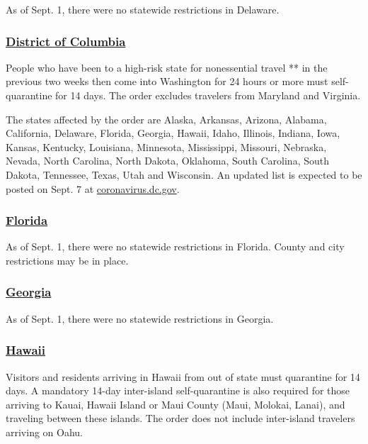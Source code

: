 As of Sept. 1, there were no statewide restrictions in Delaware.

\hypertarget{district-of-columbia}{%
\subsubsection{\texorpdfstring{\href{https://washington.org/dc-information/coronavirus-travel-update-washington-dc}{District
of Columbia}}{District of Columbia}}\label{district-of-columbia}}

People who have been to a high-risk state for nonessential travel ** in
the previous two weeks then come into Washington for 24 hours or more
must self-quarantine for 14 days. The order excludes travelers from
Maryland and Virginia.

The states affected by the order are Alaska, Arkansas, Arizona, Alabama,
California, Delaware, Florida, Georgia, Hawaii, Idaho, Illinois,
Indiana, Iowa, Kansas, Kentucky, Louisiana, Minnesota, Mississippi,
Missouri, Nebraska, Nevada, North Carolina, North Dakota, Oklahoma,
South Carolina, South Dakota, Tennessee, Texas, Utah and Wisconsin. An
updated list is expected to be posted on Sept. 7 at
\href{http://coronavirus.dc.gov/}{coronavirus.dc.gov}.

\hypertarget{florida}{%
\subsubsection{\texorpdfstring{\href{https://floridahealthcovid19.gov/travelers/}{Florida}}{Florida}}\label{florida}}

As of Sept. 1, there were no statewide restrictions in Florida. County
and city restrictions may be in place.

\hypertarget{georgia}{%
\subsubsection{\texorpdfstring{\href{https://dph.georgia.gov/covid-19-travel}{Georgia}}{Georgia}}\label{georgia}}

As of Sept. 1, there were no statewide restrictions in Georgia.

\hypertarget{hawaii}{%
\subsubsection{\texorpdfstring{\href{https://www.hawaiitourismauthority.org/covid-19-updates/}{Hawaii}}{Hawaii}}\label{hawaii}}

Visitors and residents arriving in Hawaii from out of state must
quarantine for 14 days. A mandatory 14-day inter-island self-quarantine
is also required for those arriving to Kauai, Hawaii Island or Maui
County (Maui, Molokai, Lanai), and traveling between these islands. The
order does not include inter-island travelers arriving on Oahu.

